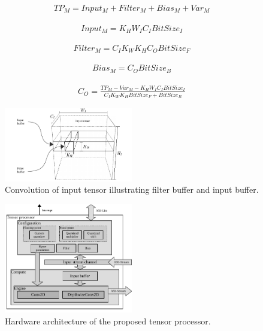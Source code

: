 \begin{eqnarray} \label{eq:tp_memory}
TP_{M}=Input_{M}+Filter_{M}+Bias_{M}+Var_{M}
\end{eqnarray}	

\begin{eqnarray} \label{eq:input_memory}
Input_{M}=K_{H}W_{I}C_{I}BitSize_{I}
\end{eqnarray}

\begin{eqnarray} \label{eq:filter_memory}
Filter_{M}=C_{I}K_{W}K_{H}C_{O}BitSize_{F}
\end{eqnarray}

\begin{eqnarray} \label{eq:bias_memory}
Bias_{M}=C_{O}BitSize_{B}
\end{eqnarray}

\begin{eqnarray} \label{eq:channel_in_memory}
C_{O}=\frac{TP_{M}-Var_{M}-K_{H}W_{I}C_{I}BitSize_{I}}{C_{I}K_{W}K_{H}BitSize_{F}+BitSize_{B}}
\end{eqnarray}

\begin{figure}[h!]
	\centering
	\includegraphics[width=0.5\textwidth]{../figures/accelerator_buffers.pdf}
	\caption{Convolution of input tensor illustrating filter buffer and input buffer.}
	\label{fig:accelerator_buffers}
\end{figure}

\begin{figure}[h!]
	\centering
	\includegraphics[width=0.5\textwidth]{../figures/accelerator.pdf}
	\caption{Hardware architecture of the proposed tensor processor.}
	\label{fig:accelerator}
\end{figure}

